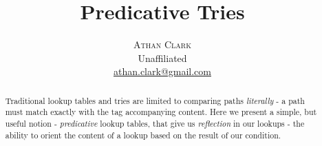 \documentclass[twoside]{article}
\title{\vspace{-10mm}\fontsize{18pt}{10pt}\selectfont\textbf{Predicative Tries}} %
\author{
\large
\textsc{Athan Clark} \\ %
\normalsize Unaffiliated \\ %
\normalsize \href{mailto:athan.clark@gmail.com}{athan.clark@gmail.com} %
\vspace{-5mm}
}
\date{}
\begin{document}
\maketitle %

\thispagestyle{fancy} %


\begin{abstract}

Traditional lookup tables and tries are limited to comparing paths \textit{literally} -
a path must match exactly with the tag accompanying content.
Here we present a simple, but useful notion - \textit{predicative} lookup tables,
that give us \textit{reflection} in our lookups - the ability to orient
the content of a lookup based on the result of our condition.

\end{abstract}

\end{document}

